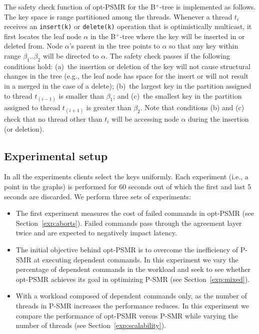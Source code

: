 \documentclass[conference]{IEEEtran}
\begin{document}
The safety check function of opt-PSMR for the B$^+$-tree is implemented as follows. 
The key space is range partitioned among the threads. 
Whenever a thread $t_i$ receives an \texttt{insert(k)} or \texttt{delete(k)} operation that is optimistically multicast, it first locates the leaf node $\alpha$ in the B$^+$-tree where the key will be inserted in or deleted from. 
Node $\alpha$'s parent in the tree points to $\alpha$ so that any key within range $\beta_1..\beta_2$ will be directed to $\alpha$.
The safety check passes if the following conditions hold:
(a)~the insertion or deletion of the key will not cause structural changes in the tree (e.g., the leaf node has space for the insert or will not result in a merged in the case of a delete);
(b)~the largest key in the partition assigned to thread $t_{(i-1)}$ is smaller than $\beta_1$; and
(c)~the smallest key in the partition assigned to thread $t_{(i+1)}$ is greater than $\beta_2$.
Note that conditions (b) and (c) check that no thread other than $t_i$ will be accessing node $\alpha$ during the insertion (or deletion).


\subsection{Experimental setup}

In all the experiments clients select the keys uniformly. Each experiment (i.e., a point in the graphs) is performed for 60 seconds out of which the first and last 5 seconds are discarded. We perform three sets of experiments: 



\begin{itemize}

\item The first experiment measures the cost of failed commands in opt-PSMR (see Section~\ref{exp:aborts}). Failed commands pass through the agreement layer twice and are expected to negatively impact  latency. 

\item The initial objective behind opt-PSMR is to overcome the inefficiency of P-SMR at executing dependent commands. In this experiment we vary the percentage of dependent commands in the workload and seek to see whether opt-PSMR achieves its goal in optimizing P-SMR (see Section~\ref{exp:mixed}). 

\item With a workload composed of dependent commands only, as the number of threads in P-SMR increases the performance reduces. In this experiment we compare the performance of opt-PSMR versus P-SMR while varying the number of threads (see Section~\ref{exp:scalability}). 

\end{itemize}
\end{document}
